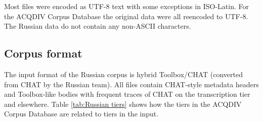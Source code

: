\documentclass[a4paper, 11pt]{book}
\begin{document}
Most files were encoded as UTF-8 text with some exceptions in ISO-Latin. For the ACQDIV Corpus Database the original data were all reencoded to UTF-8. The Russian data do not contain any non-ASCII characters. 


\subsection{Corpus format}

The input format of the Russian corpus is hybrid Toolbox/CHAT (converted from CHAT by the Russian team). All files contain CHAT-style metadata headers and Toolbox-like bodies with frequent traces of CHAT on the transcription tier and elsewhere. Table \autoref{tab:Russian tiers} shows how the tiers in the ACQDIV Corpus Database are related to tiers in the input.
\end{document}
